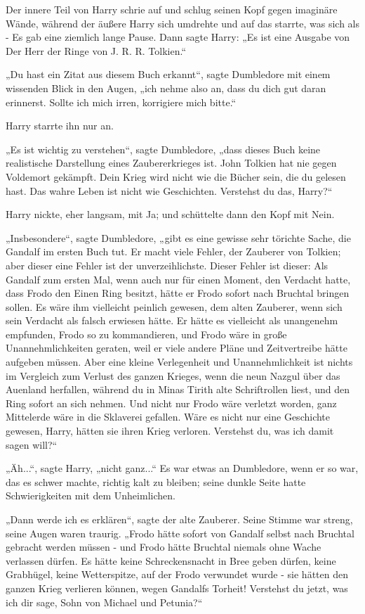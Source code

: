 {Der innere Teil von Harry schrie auf und schlug seinen Kopf gegen imaginäre Wände, während der äußere Harry sich umdrehte und auf das starrte, was sich als - Es gab eine ziemlich lange Pause. Dann sagte Harry: „Es ist eine Ausgabe von Der Herr der Ringe von J. R. R. Tolkien.“

„Du hast ein Zitat aus diesem Buch erkannt“, sagte Dumbledore mit einem wissenden Blick in den Augen, „ich nehme also an, dass du dich gut daran erinnerst. Sollte ich mich irren, korrigiere mich bitte.“

Harry starrte ihn nur an.

„Es ist wichtig zu verstehen“, sagte Dumbledore, „dass dieses Buch keine realistische Darstellung eines Zaubererkrieges ist. John Tolkien hat nie gegen Voldemort gekämpft. Dein Krieg wird nicht wie die Bücher sein, die du gelesen hast. Das wahre Leben ist nicht wie Geschichten. Verstehst du das, Harry?“

Harry nickte, eher langsam, mit Ja; und schüttelte dann den Kopf mit Nein.

„Insbesondere“, sagte Dumbledore, „gibt es eine gewisse sehr törichte Sache, die Gandalf im ersten Buch tut. Er macht viele Fehler, der Zauberer von Tolkien; aber dieser eine Fehler ist der unverzeihlichste. Dieser Fehler ist dieser: Als Gandalf zum ersten Mal, wenn auch nur für einen Moment, den Verdacht hatte, dass Frodo den Einen Ring besitzt, hätte er Frodo sofort nach Bruchtal bringen sollen. Es wäre ihm vielleicht peinlich gewesen, dem alten Zauberer, wenn sich sein Verdacht als falsch erwiesen hätte. Er hätte es vielleicht als unangenehm empfunden, Frodo so zu kommandieren, und Frodo wäre in große Unannehmlichkeiten geraten, weil er viele andere Pläne und Zeitvertreibe hätte aufgeben müssen. Aber eine kleine Verlegenheit und Unannehmlichkeit ist nichts im Vergleich zum Verlust des ganzen Krieges, wenn die neun Nazgul über das Auenland herfallen, während du in Minas Tirith alte Schriftrollen liest, und den Ring sofort an sich nehmen. Und nicht nur Frodo wäre verletzt worden, ganz Mittelerde wäre in die Sklaverei gefallen. Wäre es nicht nur eine Geschichte gewesen, Harry, hätten sie ihren Krieg verloren. Verstehst du, was ich damit sagen will?“

„Äh...“, sagte Harry, „nicht ganz...“ Es war etwas an Dumbledore, wenn er so war, das es schwer machte, richtig kalt zu bleiben; seine dunkle Seite hatte Schwierigkeiten mit dem Unheimlichen.

„Dann werde ich es erklären“, sagte der alte Zauberer. Seine Stimme war streng, seine Augen waren traurig. „Frodo hätte sofort von Gandalf selbst nach Bruchtal gebracht werden müssen - und Frodo hätte Bruchtal niemals ohne Wache verlassen dürfen. Es hätte keine Schreckensnacht in Bree geben dürfen, keine Grabhügel, keine Wetterspitze, auf der Frodo verwundet wurde - sie hätten den ganzen Krieg verlieren können, wegen Gandalfs Torheit! Verstehst du jetzt, was ich dir sage, Sohn von Michael und Petunia?“

}
